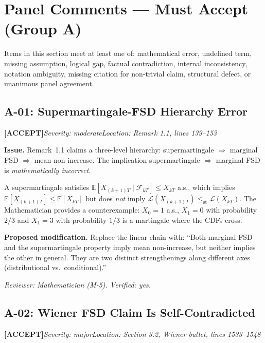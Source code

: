 \documentclass[11pt,a4paper]{article}
\newcommand{\acceptlabel}{\textbf{\textcolor{acceptgreen}{[ACCEPT]}}}
\begin{document}
\newpage
\section{Panel Comments --- Must Accept (Group A)}

Items in this section meet at least one of: mathematical error, undefined term, missing assumption, logical gap, factual contradiction, internal inconsistency, notation ambiguity, missing citation for non-trivial claim, structural defect, or unanimous panel agreement.

\subsection{A-01: Supermartingale-FSD Hierarchy Error}
\acceptlabel\quad\textit{Severity: moderate}\quad\textit{Location: Remark 1.1, lines 139--153}

\textbf{Issue.} Remark~1.1 claims a three-level hierarchy: supermartingale $\Rightarrow$ marginal FSD $\Rightarrow$ mean non-increase. The implication supermartingale $\Rightarrow$ marginal FSD is \emph{mathematically incorrect}.

A supermartingale satisfies $\mathbb{E}[X_{(k+1)T}\mid\mathcal{F}_{kT}]\le X_{kT}$ a.s., which implies $\mathbb{E}[X_{(k+1)T}]\le\mathbb{E}[X_{kT}]$ but does \emph{not} imply $\mathcal{L}(X_{(k+1)T})\le_{\mathrm{st}}\mathcal{L}(X_{kT})$. The Mathematician provides a counterexample: $X_0=1$ a.s., $X_1=0$ with probability $2/3$ and $X_1=3$ with probability $1/3$ is a martingale where the CDFs cross.

\textbf{Proposed modification.} Replace the linear chain with: ``Both marginal FSD and the supermartingale property imply mean non-increase, but neither implies the other in general. They are two distinct strengthenings along different axes (distributional vs.\ conditional).''

\textit{Reviewer: Mathematician (M-5). Verified: yes.}

\bigskip

\subsection{A-02: Wiener FSD Claim Is Self-Contradicted}
\acceptlabel\quad\textit{Severity: major}\quad\textit{Location: Section 3.2, Wiener bullet, lines 1533--1548}
\end{document}
